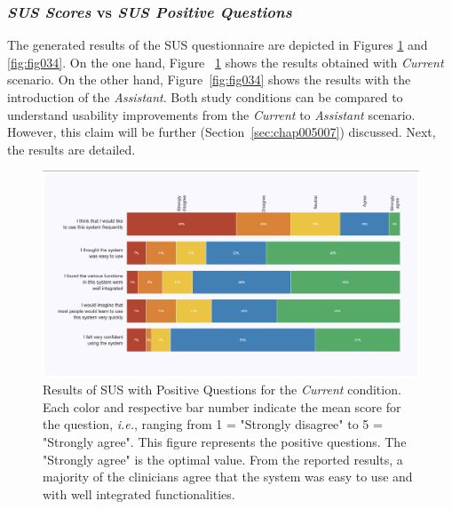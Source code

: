 \subsubsection{{\it SUS Scores} vs {\it SUS Positive Questions}}
\label{sec:chap005006001001}

The generated results of the \ac{SUS} questionnaire are depicted in Figures \ref{fig:fig033} and \ref{fig:fig034}.
On the one hand, Figure ~\ref{fig:fig033} shows the results obtained with
{\it Current} scenario.
On the other hand, Figure~\ref{fig:fig034} shows the results with the introduction of the {\it Assistant}.
Both study conditions can be compared to understand usability improvements from the {\it Current} to {\it Assistant} scenario.
However, this claim will be further (Section~\ref{sec:chap005007}) discussed.
Next, the results are detailed.

\begin{figure}[htbp]
\centering
\includegraphics[width=\textwidth]{images/fig033}
\caption{Results of SUS with Positive Questions for the {\it Current} condition. Each color and respective bar number indicate the mean score for the question, {\it i.e.}, ranging from 1 = "Strongly disagree" to 5 = "Strongly agree". This figure represents the positive questions. The "Strongly agree" is the optimal value. From the reported results, a majority of the clinicians agree that the system was easy to use and with well integrated functionalities.}
\label{fig:fig033}
\end{figure}

